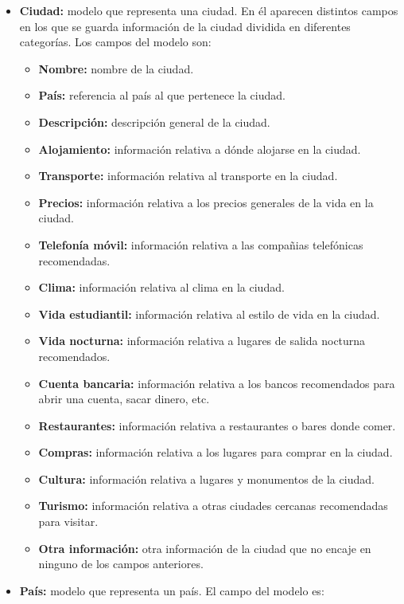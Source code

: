 \documentclass[a4paper, 12pt]{book}
\begin{document}
\begin{itemize}
    \item \textbf{Ciudad:} modelo que representa una ciudad. En él aparecen distintos campos en los que se guarda información de la ciudad dividida en diferentes categorías. Los campos del modelo son:
    \begin{itemize}
        \item \textbf{Nombre:} nombre de la ciudad.
        \item \textbf{País:} referencia al país al que pertenece la ciudad.
        \item \textbf{Descripción:} descripción general de la ciudad.
        \item \textbf{Alojamiento:} información relativa a dónde alojarse en la ciudad.
        \item \textbf{Transporte:} información relativa al transporte en la ciudad.
        \item \textbf{Precios:} información relativa a los precios generales de la vida en la ciudad.
        \item \textbf{Telefonía móvil:} información relativa a las compañias telefónicas recomendadas.
        \item \textbf{Clima:} información relativa al clima en la ciudad.
        \item \textbf{Vida estudiantil:} información relativa al estilo de vida en la ciudad.
        \item \textbf{Vida nocturna:} información relativa a lugares de salida nocturna recomendados.
        \item \textbf{Cuenta bancaria:} información relativa a los bancos recomendados para abrir una cuenta, sacar dinero, etc.
        \item \textbf{Restaurantes:} información relativa a restaurantes o bares donde comer.
        \item \textbf{Compras:} información relativa a los lugares para comprar en la ciudad.
        \item \textbf{Cultura:} información relativa a lugares y monumentos de la ciudad.
        \item \textbf{Turismo:} información relativa a otras ciudades cercanas recomendadas para visitar.
        \item \textbf{Otra información:} otra información de la ciudad que no encaje en ninguno de los campos anteriores.
    \end{itemize}
    \item \textbf{País:} modelo que representa un país. El campo del modelo es:
     \begin{itemize}

\end{itemize}
\end{itemize}
\end{document}
